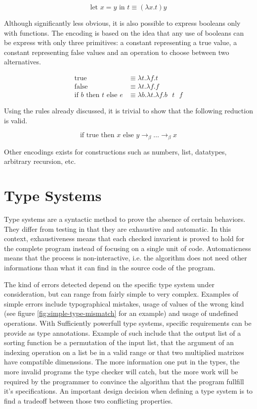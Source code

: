 \begin{displaymath}
  \text{let } x = y \text{ in } t \equiv (\lambda x. t) y
\end{displaymath}

Although significantly less obvious, it is also possible to express booleans only with functions.
The encoding is based on the idea that any use of booleans can be express with only three
primitives: a constant representing a true value, a constant representing false values and an
operation to choose between two alternatives.

\begin{align*}
  \text{true}
    & \equiv \lambda t. \lambda f. t \\
  \text{false}
    & \equiv \lambda t. \lambda f. f \\
  \text{if } b \text{ then } t \text{ else } e
    & \equiv \lambda b. \lambda t. \lambda f. b \text{ } t \text{ } f
\end{align*}

Using the rules already discussed, it is trivial to show that the following reduction is valid.

\begin{displaymath}
  \text{if true then } x \text{ else } y \to_\beta \dots \to_\beta x
\end{displaymath}

Other encodings exists for constructions such as numbers, list, datatypes, arbitrary recursion, etc.

\section{Type Systems}

Type systems are a syntactic method to prove the absence of certain behaviors. They differ from
testing in that they are exhaustive and automatic. In this context, exhaustiveness means that each
checked invarient is proved to hold for the complete program instead of focusing on a single unit of
code. Automaticness means that the process is non-interactive, i.e. the algorithm does not need
other informations than what it can find in the source code of the program.

The kind of errors detected depend on the specific type system under consideration, but can range
from fairly simple to very complex. Examples of simple errors include typographical mistakes, usage
of values of the wrong kind (see figure \ref{fig:simple-type-mismatch} for an example) and usage of
undefined operations. With Sufficiently powerfull type systems, specific requirements can be provide
as type annotations. Example of such include that the output list of a sorting function be a
permutation of the input list, that the argument of an indexing operation on a list be in a valid
range or that two multiplied matrixes have compatible dimenssions. The more information one put in
the types, the more invalid programs the type checker will catch, but the more work will be required
by the programmer to convince the algorithm that the program fullfill it's specifications. An
important design decision when defining a type system is to find a tradeoff between those two
conflicting properties.

